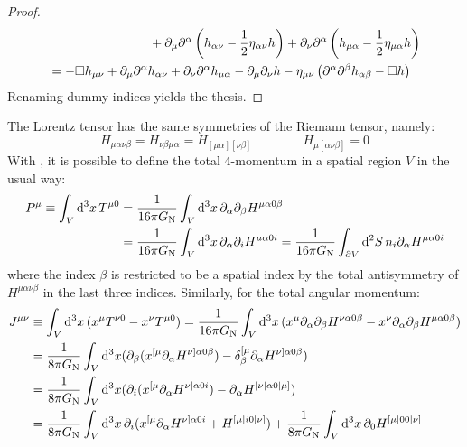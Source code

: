\begin{proofbox}
\begin{proof}
\begin{equation*}
\begin{split}
        & \qquad \qquad \qquad \qquad + \partial_\mu \partial^\alpha \left( h_{\alpha \nu} - \frac{1}{2} \eta_{\alpha \nu} h \right) + \partial_\nu \partial^\alpha \left( h_{\mu \alpha} - \frac{1}{2} \eta_{\mu \alpha} h \right) \\
        & = - \Box h_{\mu \nu} + \partial_\mu \partial^\alpha h_{\alpha \nu} + \partial_\nu \partial^\alpha h_{\mu \alpha} - \partial_\mu \partial_\nu h - \eta_{\mu \nu} \left( \partial^\alpha \partial^\beta h_{\alpha \beta} - \Box h \right)
      \end{split}
    \end{equation*}
    Renaming dummy indices yields the thesis.
  \end{proof}
\end{proofbox}

The Lorentz tensor has the same symmetries of the Riemann tensor, namely:
\begin{equation}
  H_{\mu \alpha \nu \beta} = H_{\nu \beta \mu \alpha} = H_{[\mu \alpha] [\nu \beta]}
  \qquad \qquad
  H_{\mu [\alpha \nu \beta]} = 0
  \label{eq:lorentz-symmetries}
\end{equation}
With , it is possible to define the total $ 4 $-momentum in a spatial region $ V $ in the usual way:
\begin{equation*}
  \begin{split}
    P^\mu \equiv \int_V \mathrm{d}^3x \, T^{\mu 0}
    & = \frac{1}{16\pi G_\text{N}} \int_V \mathrm{d}^3x \, \partial_\alpha \partial_\beta H^{\mu \alpha 0 \beta} \\
    & = \frac{1}{16\pi G_\text{N}} \int_V \mathrm{d}^3x \, \partial_\alpha \partial_i H^{\mu \alpha 0 i} = \frac{1}{16\pi G_\text{N}} \int_{\partial V} \mathrm{d}^2S \, n_i \partial_\alpha H^{\mu \alpha 0 i}
  \end{split}
\end{equation*}
where the index $ \beta $ is restricted to be a spatial index by the total antisymmetry of $ H^{\mu \alpha \nu \beta} $ in the last three indices.
Similarly, for the total angular momentum:
\begin{equation*}
  \begin{split}
    J^{\mu \nu}
    & \equiv \int_V \mathrm{d}^3x \, ( x^\mu T^{\nu 0} - x^\nu T^{\mu 0} ) = \frac{1}{16\pi G_\text{N}} \int_V \mathrm{d}^3x \, ( x^\mu \partial_\alpha \partial_\beta H^{\nu \alpha 0 \beta} - x^\nu \partial_\alpha \partial_\beta H^{\mu \alpha 0 \beta} ) \\
    & = \frac{1}{8\pi G_\text{N}} \int_V \mathrm{d}^3x (\partial_\beta (x^{[\mu} \partial_\alpha H^{\nu] \alpha 0 \beta}) - \delta^{[\mu}_\beta \partial_\alpha H^{\nu] \alpha 0 \beta}) \\
    & = \frac{1}{8\pi G_\text{N}} \int_V \mathrm{d}^3x (\partial_i (x^{[\mu} \partial_\alpha H^{\nu] \alpha 0 i}) - \partial_\alpha H^{[\nu | \alpha 0 | \mu]}) \\
    & = \frac{1}{8\pi G_\text{N}} \int_V \mathrm{d}^3x \, \partial_i (x^{[\mu} \partial_\alpha H^{\nu]\alpha 0 i} + H^{[\mu | i 0 | \nu]}) + \frac{1}{8\pi G_\text{N}} \int_V \mathrm{d}^3x \, \partial_0 H^{[\mu | 0 0 | \nu]}
  \end{split}
\end{equation*}
